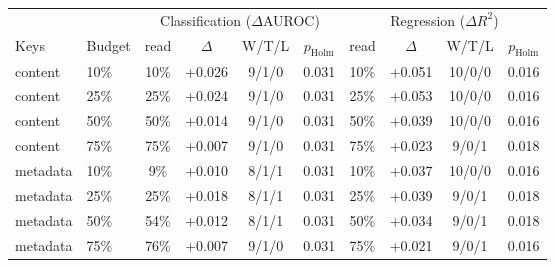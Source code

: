 \begin{tabular}{@{}llcccccccc@{}}
\toprule
 & & \multicolumn{4}{c}{Classification ($\Delta$AUROC)} & \multicolumn{4}{c}{Regression ($\Delta R^2$)} \\
\cmidrule(lr){3-6}\cmidrule(lr){7-10}
Keys & Budget & read & $\Delta$ & W/T/L & $p_{\text{Holm}}$ & read & $\Delta$ & W/T/L & $p_{\text{Holm}}$ \\
\midrule
content & 10\% & 10\% & +0.026 & 9/1/0 & 0.031 & 10\% & +0.051 & 10/0/0 & 0.016 \\
content & 25\% & 25\% & +0.024 & 9/1/0 & 0.031 & 25\% & +0.053 & 10/0/0 & 0.016 \\
content & 50\% & 50\% & +0.014 & 9/1/0 & 0.031 & 50\% & +0.039 & 10/0/0 & 0.016 \\
content & 75\% & 75\% & +0.007 & 9/1/0 & 0.031 & 75\% & +0.023 & 9/0/1 & 0.018 \\
\midrule
metadata & 10\% & 9\% & +0.010 & 8/1/1 & 0.031 & 10\% & +0.037 & 10/0/0 & 0.016 \\
metadata & 25\% & 25\% & +0.018 & 8/1/1 & 0.031 & 25\% & +0.039 & 9/0/1 & 0.018 \\
metadata & 50\% & 54\% & +0.012 & 8/1/1 & 0.031 & 50\% & +0.034 & 9/0/1 & 0.018 \\
metadata & 75\% & 76\% & +0.007 & 9/1/0 & 0.031 & 75\% & +0.021 & 9/0/1 & 0.016 \\
\bottomrule
\end{tabular}
